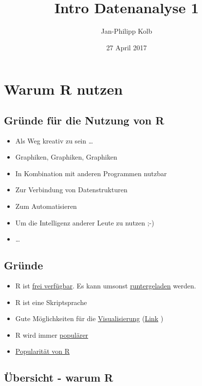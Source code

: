 \documentclass[]{article}
\title{Intro Datenanalyse 1}
\author{Jan-Philipp Kolb}
\date{27 April 2017}
\providecommand{\tightlist}{%
  \setlength{\itemsep}{0pt}\setlength{\parskip}{0pt}}
\begin{document}
\maketitle

\section{Warum R nutzen}\label{warum-r-nutzen}

\subsection{Gründe für die Nutzung von
R}\label{grunde-fur-die-nutzung-von-r}

\begin{itemize}
\tightlist
\item
  Als Weg kreativ zu sein \ldots{}
\item
  Graphiken, Graphiken, Graphiken
\item
  In Kombination mit anderen Programmen nutzbar
\item
  Zur Verbindung von Datenstrukturen
\item
  Zum Automatisieren
\item
  Um die Intelligenz anderer Leute zu nutzen ;-)
\item
  \ldots{}
\end{itemize}

\subsection{Gründe}\label{grunde}

\begin{itemize}
\tightlist
\item
  R ist \href{http://www.inside-r.org/why-use-r}{frei verfügbar}. Es
  kann umsonst \href{http://mirrors.softliste.de/cran/}{runtergeladen}
  werden.
\item
  R ist eine Skriptsprache
\item
  Gute Möglichkeiten für die
  \href{http://research.stowers-institute.org/efg/R/}{Visualisierung}
  (\href{http://www.sr.bham.ac.uk/~ajrs/R/r-gallery.html}{Link} )
\item
  R wird immer
  \href{https://twitter.com/josiahjdavis/status/559778930476220418}{populärer}
\item
  \href{http://blog.revolutionanalytics.com/popularity/}{Popularität von
  R}
\end{itemize}

\subsection{Übersicht - warum R}\label{ubersicht---warum-r}
\end{document}
